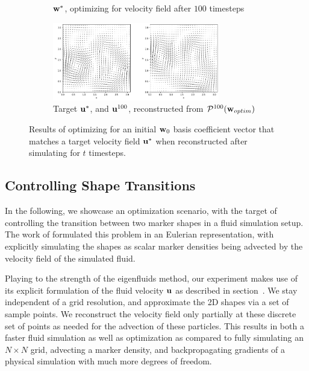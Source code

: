 \begin{figure}
\begin{subfigure}{\textwidth}
{    $\vb{w}^*$, optimizing for velocity field after $100$ timesteps\\}
    \label{fig:100-timesteps-coeffs}
  \end{subfigure}\par\medskip
  \begin{subfigure}{\textwidth}
    \centering
    \includegraphics[width=0.8\textwidth]{figures/finding-initial-velocities/t_100_velocities.png}
    \caption{Target $\vb{u}^*$, and $\vb{u}^{100}$, reconstructed from
      $\mathcal{P}^{100}(\vb{w}_{optim})$}
    \label{fig:100-timesteps-vel}
  \end{subfigure}
  \caption{Results of optimizing for an initial $\vb{w}_0$ basis coefficient
    vector that matches a target velocity field $\vb{u}^*$ when reconstructed
    after simulating for $t$ timesteps.
  }
  \label{fig:matching-velocities}
\end{figure}

\subsection{Controlling Shape Transitions}
\label{section:controlling-shape-transitions}
In the following, we showcase an optimization scenario, with the target of
controlling the transition between two marker shapes in a fluid simulation
setup.  The work of \cite{holl2019pdecontrol} formulated this problem in an
Eulerian representation, with explicitly simulating the shapes as scalar marker
densities being advected by the velocity field of the simulated fluid. 

Playing to the strength of the eigenfluids method, our experiment makes use of
its explicit formulation of the fluid velocity $\vb{u}$ as described in
section~. We stay independent of a grid resolution, and
approximate the 2D shapes via a set of sample points. We reconstruct the
velocity field only partially at these discrete set of points as needed for the
advection of these particles. This results in both a faster fluid simulation as
well as optimization as compared to fully simulating an $N\times N$ grid,
advecting a marker density, and backpropagating gradients of a physical
simulation with much more degrees of freedom.

